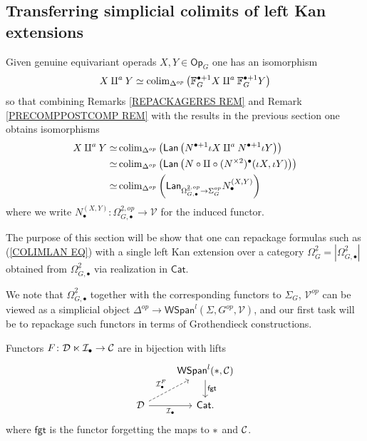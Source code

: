 \documentclass[a4paper,10pt]{article}%
\begin{document}
\subsection{Transferring simplicial colimits of left Kan extensions} \label{TRANSFSIMP SEC}


Given genuine equivariant operads 
$X,Y \in \mathsf{Op}_G$
one has an isomorphism
\[
X \amalg^a Y 
\simeq
\operatorname{colim}_{\Delta^{op}} 
\left(
  \mathbb{F}_G^{\bullet+1} X \amalg^a \mathbb{F}_G^{\bullet+1} Y
\right)
\]
so that combining Remarks \ref{REPACKAGERES REM}
and
Remark \ref{PRECOMPPOSTCOMP REM}
with the results in the previous section one obtains isomorphisms
\begin{align}
  X \amalg^a Y  
  \simeq &
  \operatorname{colim}_{\Delta^{op}} 
  \left(
    \mathsf{Lan} \left(
      N^{\bullet+1} \iota X \amalg^a N^{\bullet+1} \iota Y
    \right) \right)
  \\
  \simeq &
  \operatorname{colim}_{\Delta^{op}} 
  \left(
    \mathsf{Lan} \left(
      N \circ \amalg \circ (N^{\times 2})^{\bullet} (\iota X,\iota Y)
    \right) \right)
  \\ \label{COLIMLAN EQ}
  \simeq &
  \operatorname{colim}_{\Delta^{op}} 
  \left(
    \mathsf{Lan}_{\Omega_{G,\bullet}^{\underline{2},op} \to \Sigma_G^{op}}
    N_{\bullet}^{(X,Y)}
  \right)
\end{align}
where we write 
$N_{\bullet}^{(X,Y)} \colon \Omega_{G,\bullet}^{\underline{2},op} \to \mathcal{V}$
for the induced functor.

The purpose of this section will be show that one can repackage 
formulas such as (\ref{COLIMLAN EQ})
with a single left Kan extension over a category
$\Omega_G^{\underline{2}} = |\Omega_{G,\bullet}^{\underline{2}}|$
obtained from 
$\Omega_{G,\bullet}^{\underline{2}}$
via realization in $\mathsf{Cat}$.

We note that $\Omega_{G,\bullet}^{\underline{2}}$ together with the corresponding functors to $\Sigma_G$, $\mathcal{V}^{op}$
can be viewed as a simplicial object 
$\Delta^{op} \to \mathsf{WSpan}^l(\Sigma,G^{op},\mathcal{V})$,
and our first task will be to repackage such functors in terms of Grothendieck constructions.


\begin{lemma}\label{SIMPSPANREIN LEMMA}
  Functors $F \colon \mathcal{D} \ltimes \mathcal{I}_{\bullet} \to \mathcal{C}$ are in bijection with lifts
  \[
  \begin{tikzcd}
    & \mathsf{WSpan}^l(\**,\C) \ar{d}{\mathsf{fgt}} \\
    \mathcal{D} \ar{r}[swap]{\mathcal{I}_{\bullet}} \ar[dashed]{ru}{\mathcal{I}_{\bullet}^F} & \mathsf{Cat}.
  \end{tikzcd}
  \]
  where $\mathsf{fgt}$ is the functor forgetting the maps to $\**$ and $\mathcal{C}$.
\end{lemma}
\end{document}
